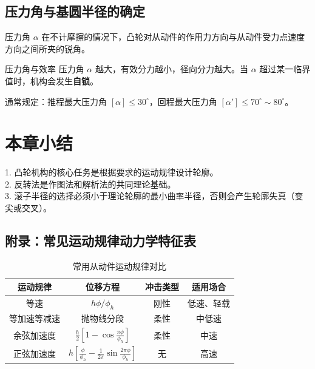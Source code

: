 \subsection{压力角与基圆半径的确定}
\begin{definition}{压力角 $\alpha$}
	在不计摩擦的情况下，凸轮对从动件的作用力方向与从动件受力点速度方向之间所夹的锐角。
\end{definition}

\begin{lemma}{压力角与效率}
	压力角 $\alpha$ 越大，有效分力越小，径向分力越大。当 $\alpha$ 超过某一临界值时，机构会发生\textbf{自锁}。
\end{lemma}

\begin{remark}
	通常规定：推程最大压力角 $[\alpha] \le 30^\circ$，回程最大压力角 $[\alpha'] \le 70^\circ \sim 80^\circ$。
\end{remark}

\section{本章小结}
1. 凸轮机构的核心任务是根据要求的运动规律设计轮廓。\\
2. 反转法是作图法和解析法的共同理论基础。\\
3. 滚子半径的选择必须小于理论轮廓的最小曲率半径，否则会产生轮廓失真（变尖或交叉）。

\newpage
\subsection*{附录：常见运动规律动力学特征表}
\begin{table}[H]
	\centering
	\renewcommand{\arraystretch}{1.5}
	\begin{tabular}{|c|c|c|c|}
		\hline
		\rowcolor{structurecolor!20} \textbf{运动规律} & \textbf{位移方程} & \textbf{冲击类型} & \textbf{适用场合} \\ \hline
		等速 & $h\phi/\phi_h$ & 刚性 & 低速、轻载 \\ \hline
		等加速等减速 & 抛物线分段 & 柔性 & 中低速 \\ \hline
		余弦加速度 & $\frac{h}{2}[1-\cos\frac{\pi\phi}{\phi_h}]$ & 柔性 & 中速 \\ \hline
		正弦加速度 & $h[\frac{\phi}{\phi_h}-\frac{1}{2\pi}\sin\frac{2\pi\phi}{\phi_h}]$ & 无 & 高速 \\ \hline
	\end{tabular}
	\caption{常用从动件运动规律对比}
\end{table}


